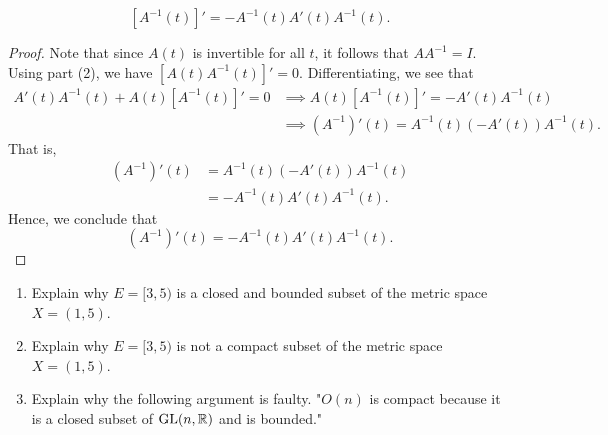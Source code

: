 \documentclass[a4paper]{article}
\begin{document}
\begin{enumerate}
    \[  [A^{-1}(t)]' = -A^{-1}(t) A'(t) A^{-1}(t). \]
    \begin{proof}
        Note that since \( A(t) \) is invertible for all \( t  \), it follows that \( A A^{-1} = I  \). Using part (2), we have \( [A(t) A^{-1}(t)]' = 0  \). Differentiating, we see that 
        \begin{align*}
            A'(t) A^{-1}(t) + A(t) [A^{-1}(t)]' = 0 &\implies A(t) [A^{-1}(t)]' = - A'(t) A^{-1}(t) \\
                                                    &\implies (A^{-1})'(t) = A^{-1}(t) (- A'(t)) A^{-1}(t).
        \end{align*}
        That is, 
        \begin{align*}
            (A^{-1})'(t) &= A^{-1}(t) (- A'(t)) A^{-1}(t) \\
                         &= - A^{-1}(t) A'(t) A^{-1}(t).
        \end{align*}
        Hence, we conclude that  
        \[  (A^{-1})'(t) = - A^{-1}(t) A'(t) A^{-1}(t). \]
    \end{proof}
\end{enumerate}

\begin{problem}
   \begin{enumerate}
       \item Explain why \( E = [3,5) \) is a closed and bounded subset of the metric space \( X = (1,5) \).
        \item Explain why \( E = [3,5) \) is not a compact subset of the metric space \( X = (1,5) \).
        \item Explain why the following argument is faulty. "\( O(n)  \) is compact because it is a closed subset of \( \text{GL}(n,\mathbb{R})  \) and is bounded."
   \end{enumerate} 
\end{problem}
\end{document}
